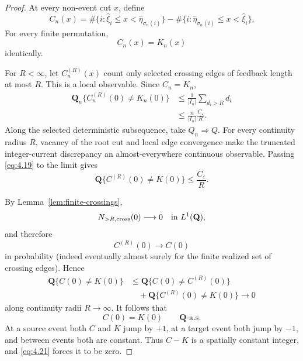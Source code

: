 \documentclass[11pt,reqno]{amsart}
\theoremstyle{definition}
\theoremstyle{remark}
\numberwithin{equation}{section}
\begin{document}
\begin{proof}
At every non-event cut \(x\), define
\[
C_n(x)
=
\#\{i:\widehat\xi_i\le x<\widehat\eta_{\sigma_n(i)}\}
-
\#\{i:\widehat\eta_{\sigma_n(i)}\le x<\widehat\xi_i\}.
\]
For every finite permutation,
\begin{equation}
\boxed{C_n(x)=K_n(x)}
\label{eq:4.18}
\end{equation}
identically.

For \(R<\infty\), let \(C_n^{(R)}(x)\) count only selected crossing edges
of feedback length at most \(R\).  This is a local observable.  Since
\(C_n=K_n\),
\begin{equation}
\begin{aligned}
\mathbf Q_n\{C_n^{(R)}(0)\neq K_n(0)\}
&\le
\frac1{|I_n|}\sum_{d_i>R}d_i\\
&\le
\frac n{|I_n|}\frac{C_\varepsilon}{R}.
\end{aligned}
\label{eq:4.19}
\end{equation}
Along the selected deterministic subsequence, take \(Q_n\Rightarrow Q\).
For every continuity radius \(R\), vacancy of the root cut and local
edge convergence make the truncated integer-current discrepancy
an almost-everywhere continuous observable.  Passing \eqref{eq:4.19} to the
limit gives
\begin{equation}
\mathbf Q\{C^{(R)}(0)\neq K(0)\}\le\frac{C_\varepsilon}{R}.
\label{eq:4.20}
\end{equation}

By Lemma~\ref{lem:finite-crossings},
\[
N_{>R,\rm cross}(0)\longrightarrow0
\quad\text{in }L^1(\mathbf Q),
\]
and therefore
\[
C^{(R)}(0)\longrightarrow C(0)
\]
in probability (indeed eventually almost surely for the finite realized
set of crossing edges).  Hence
\[
\begin{aligned}
\mathbf Q\{C(0)\neq K(0)\}
&\le
\mathbf Q\{C(0)\neq C^{(R)}(0)\}\\
&\quad+
\mathbf Q\{C^{(R)}(0)\neq K(0)\}
\longrightarrow0
\end{aligned}
\]
along continuity radii \(R\to\infty\).  It follows that
\begin{equation}
C(0)=K(0)\qquad\mathbf Q\text{-a.s.}
\label{eq:4.21}
\end{equation}
At a source event both \(C\) and \(K\) jump by \(+1\), at a target event
both jump by \(-1\), and between events both are constant.  Thus
\(C-K\) is a spatially constant integer, and \eqref{eq:4.21} forces it to be
zero.
\end{proof}
\end{document}
